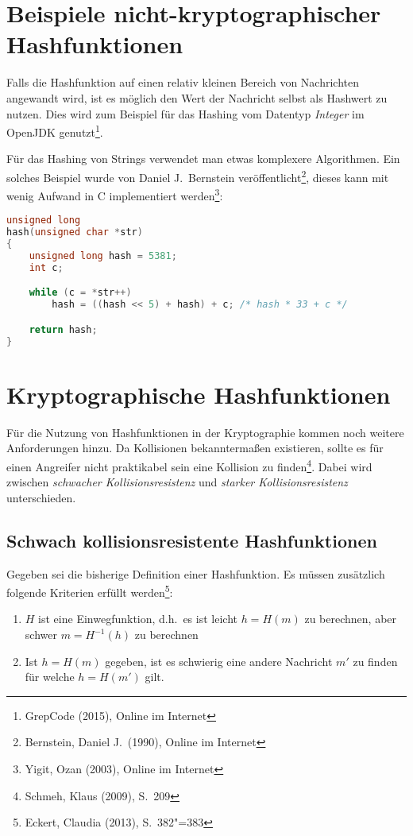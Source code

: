 \section{Beispiele nicht-kryptographischer Hashfunktionen}

Falls die Hashfunktion auf einen relativ kleinen Bereich von
Nachrichten angewandt wird, ist es möglich den Wert der Nachricht
selbst als Hashwert zu nutzen.  Dies wird zum Beispiel für das Hashing
vom Datentyp \emph{Integer} im OpenJDK genutzt\footnote{GrepCode
  (2015), Online im Internet}.

Für das Hashing von Strings verwendet man etwas komplexere
Algorithmen.  Ein solches Beispiel wurde von Daniel J.~Bernstein
veröffentlicht\footnote{Bernstein, Daniel J.~(1990), Online im
  Internet}, dieses kann mit wenig Aufwand in C implementiert
werden\footnote{Yigit, Ozan (2003), Online im Internet}:

\begin{lstlisting}[language=C,basicstyle=\ttfamily\footnotesize,keywordstyle=\bfseries\color{black},captionpos=b,caption={djb2}]
unsigned long
hash(unsigned char *str)
{
    unsigned long hash = 5381;
    int c;

    while (c = *str++)
        hash = ((hash << 5) + hash) + c; /* hash * 33 + c */

    return hash;
}
\end{lstlisting}

\section{Kryptographische Hashfunktionen}

Für die Nutzung von Hashfunktionen in der Kryptographie kommen noch
weitere Anforderungen hinzu.  Da Kollisionen bekanntermaßen
existieren, sollte es für einen Angreifer nicht praktikabel sein eine
Kollision zu finden\footnote{Schmeh, Klaus (2009), S.~209}.  Dabei
wird zwischen \emph{schwacher Kollisionsresistenz} und \emph{starker
  Kollisionsresistenz} unterschieden.

\subsection{Schwach kollisionsresistente Hashfunktionen}

Gegeben sei die bisherige Definition einer Hashfunktion.  Es müssen
zusätzlich folgende Kriterien erfüllt werden\footnote{Eckert, Claudia
  (2013), S.~382"=383}:

\begin{enumerate}
\item $H$ ist eine Einwegfunktion, d.h.~es ist leicht $h = H(m)$ zu
  berechnen, aber schwer $m = H^{-1}(h)$ zu berechnen
\item Ist $h = H(m)$ gegeben, ist es schwierig eine andere Nachricht
  $m'$ zu finden für welche $h = H(m')$ gilt.
\end{enumerate}

